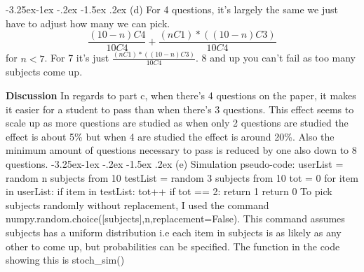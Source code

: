 \documentclass[10pt]{article} %
\makeatletter
\renewcommand\subsection{\@startsection{subsection}{2}{\z@}%
                                     {-3.25ex\@plus -1ex \@minus -.2ex}%
                                     {-1.5ex \@plus .2ex}%
                                     {\normalfont\large\bfseries}}
\makeatother
\begin{document}
\subsection{(d)}
For 4 questions, it's largely the same we just have to adjust how many we can pick. \[\frac{(10-n)C4}{10C4} + \frac{(nC1) * ((10-n)C3)}{10C4} \] for \(n < 7 \). For 7 it's just \(\frac{(nC1) * ((10-n)C3)}{10C4}\). 8 and up you can't fail as too many subjects come up.
\begin{figure}[h]
    \centering
    \qquad
    \label{fig:example}
\end{figure}
\newline
\textbf{Discussion} In regards to part c, when there's 4 questions on the paper, it makes it easier for a student to pass than when there's 3 questions. This effect seems to scale up as more questions are studied as when only 2 questions are studied the effect is about 5\% but when 4 are studied the effect is around 20\%. Also the minimum amount of questions necessary to pass is reduced by one also down to 8 questions. 
\subsection{(e)}
Simulation pseudo-code:
\newline
userList = random n subjects from 10
\newline
testList = random 3 subjects from 10
\newline
tot = 0
\newline
for item in userList:
\newline
	\indent if item in testList: tot++
	\newline
	\indent if tot == 2: return 1
	\newline
return 0 
\newline
To pick subjects randomly without replacement, I used the command \newline numpy.random.choice([subjects],n,replacement=False).
\newline This command assumes subjects has a uniform distribution i.e each item in subjects is as likely as any other to come up, but probabilities can be specified. The function in the code showing this is stoch\_sim()
\end{document}
